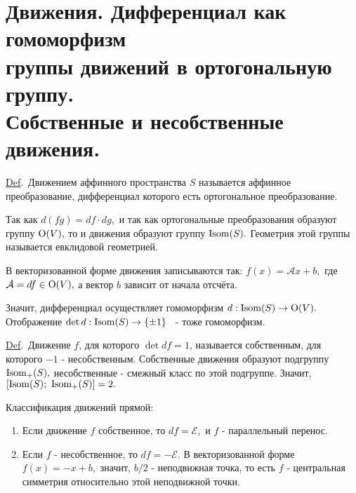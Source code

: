 \documentclass[a4paper]{article}%
\renewcommand{\de}{\par\noindent\underline{Def}.\ }%
\renewcommand{\ab}{\par\noindent}%
\renewcommand{\om}[1]{\mathcal{#1}}
\begin{document}
\section{Движения. Дифференциал как гомоморфизм\\ группы движений в ортогональную группу.\\ Собственные и несобственные движения.}
\label{q47}
\de Движением аффинного пространства $S$ называется аффинное преобразование, дифференциал которого есть ортогональное преобразование.
\ab Так как $d(fg)=df\cdot dg,$ и так как ортогональные преобразования образуют группу ${\rm O}(V),$ то и движения образуют
группу ${\rm Isom}(S).$ Геометрия этой группы называется евклидовой геометрией.
\ab В векторизованной форме движения записываются так: $f(x)=\om{A}x+b,$ где $\om{A}=df\in{\rm O}(V),$ а вектор $b$
зависит от начала отсчёта.
\ab Значит, дифференциал осуществляет гомоморфизм $d:{\rm Isom}(S)\rightarrow{\rm O}(V).$\\ Отображение $\det d:{\rm Isom}(S)\rightarrow\{\pm 1\}$
\ - тоже гомоморфизм.
\de Движение $f$, для которого $\det df=1$, называется собственным, для которого $-1$ - несобственным.
Собственные движения образуют подгруппу ${\rm Isom}_+(S),$ несобственные - смежный класс по этой подгруппе.
Значит, $[{\rm Isom}(S);\ {\rm Isom}_+(S)]=2.$
\ab Классификация движений прямой:
\begin{enumerate}
    \item Если движение $f$ собственное, то $df=\om{E},$ и $f$ - параллельный перенос.
    \item Если $f$ - несобственное, то $df=\om{-E}.$ В векторизованной форме $f(x)=-x+b,$ значит,
    $b/2$ - неподвижная точка, то есть $f$ - центральная симметрия относительно этой неподвижной точки.
\end{enumerate}
\end{document}
